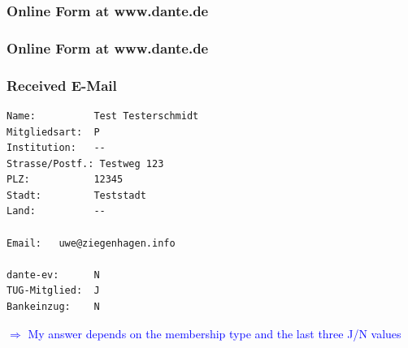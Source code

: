 \documentclass[12pt,ngerman]{beamer}
\begin{document}
\begin{frame}
\frametitle{Online Form at www.dante.de}

\begin{center}
\end{center}

\end{frame}

 \begin{frame}
\frametitle{Online Form at www.dante.de}

\begin{center}
\end{center}

\end{frame}

\begin{frame}[fragile]
\frametitle{Received E-Mail}

{\footnotesize
\begin{lstlisting}
Name:          Test Testerschmidt
Mitgliedsart:  P
Institution:   --
Strasse/Postf.: Testweg 123
PLZ:           12345
Stadt:         Teststadt
Land:          --

Email:   uwe@ziegenhagen.info 

dante-ev:      N
TUG-Mitglied:  J
Bankeinzug:    N
\end{lstlisting}
}

\textcolor{blue}{$\Rightarrow$ My answer depends on the membership type and the last three J/N values}

\end{frame}
\end{document}
